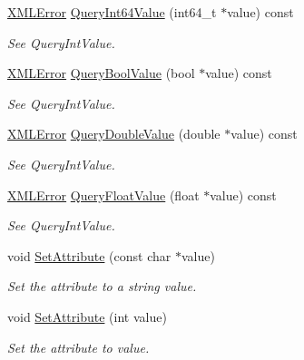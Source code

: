 \begin{DoxyCompactItemize}
\mbox{\hyperlink{namespacetinyxml2_a1fbf88509c3ac88c09117b1947414e08}{X\+M\+L\+Error}} \mbox{\hyperlink{classtinyxml2_1_1_x_m_l_attribute_a4e25344d6e4159026be34dbddf1dcac2}{Query\+Int64\+Value}} (int64\+\_\+t $\ast$value) const
\begin{DoxyCompactList}\small\item\em See Query\+Int\+Value. \end{DoxyCompactList}\item 
\mbox{\hyperlink{namespacetinyxml2_a1fbf88509c3ac88c09117b1947414e08}{X\+M\+L\+Error}} \mbox{\hyperlink{classtinyxml2_1_1_x_m_l_attribute_a5f32e038954256f61c21ff20fd13a09c}{Query\+Bool\+Value}} (bool $\ast$value) const
\begin{DoxyCompactList}\small\item\em See Query\+Int\+Value. \end{DoxyCompactList}\item 
\mbox{\hyperlink{namespacetinyxml2_a1fbf88509c3ac88c09117b1947414e08}{X\+M\+L\+Error}} \mbox{\hyperlink{classtinyxml2_1_1_x_m_l_attribute_a2aa6e55e8ea03af0609cf6690bff79b9}{Query\+Double\+Value}} (double $\ast$value) const
\begin{DoxyCompactList}\small\item\em See Query\+Int\+Value. \end{DoxyCompactList}\item 
\mbox{\hyperlink{namespacetinyxml2_a1fbf88509c3ac88c09117b1947414e08}{X\+M\+L\+Error}} \mbox{\hyperlink{classtinyxml2_1_1_x_m_l_attribute_a049dea6449a6259b6cfed44a9427b607}{Query\+Float\+Value}} (float $\ast$value) const
\begin{DoxyCompactList}\small\item\em See Query\+Int\+Value. \end{DoxyCompactList}\item 
void \mbox{\hyperlink{classtinyxml2_1_1_x_m_l_attribute_a406d2c4a13c7af99a65edb59dd9f7581}{Set\+Attribute}} (const char $\ast$value)
\begin{DoxyCompactList}\small\item\em Set the attribute to a string value. \end{DoxyCompactList}\item 
void \mbox{\hyperlink{classtinyxml2_1_1_x_m_l_attribute_ad86d7d7058d76761c3a80662566a57e5}{Set\+Attribute}} (int value)
\begin{DoxyCompactList}\small\item\em Set the attribute to value. \end{DoxyCompactList}\item 

\end{DoxyCompactItemize}
